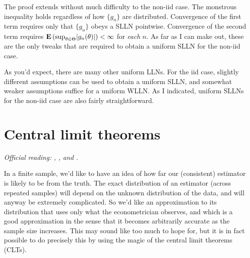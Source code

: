 \documentclass[11pt,letterpaper,reqno,oneside]{article}
\begin{document}
\begin{remark}
	\label{remark:non-iid_ULLNs}
	The proof extends without much difficulty to the non-iid case. The monstrous inequality holds regardless of how $\{ g_n \}$ are distributed. Convergence of the first term requires only that $\{ g_n \}$ obeys a SLLN pointwise. Convergence of the second term requires $\E\left( \sup_{\theta \in \Theta} \abs*{g_n(\theta)} \right) < \infty$ for \emph{each} $n$. As far as I can make out, these are the only tweaks that are required to obtain a uniform SLLN for the non-iid case.
\end{remark}

As you'd expect, there are many other uniform LLNs. For the iid case, slightly different assumptions can be used to obtain a uniform SLLN, and somewhat weaker assumptions suffice for a uniform WLLN. As I indicated, uniform SLLNs for the non-iid case are also fairly straightforward.



\pagebreak
\section{Central limit theorems}
\label{sec:CLTs}

\emph{%
Official reading: \textcite[][ch. 3]{Amemiya1985}, \textcite[][ch. 2]{Rao1973}, \textcite[][sec. 27]{Billingsley1995} and \textcite[][ch. 5]{White2001}.}

In a finite sample, we'd like to have an idea of how far our (consistent) estimator is likely to be from the truth. The exact distribution of an estimator (across repeated samples) will depend on the unknown distribution of the data, and will anyway be extremely complicated. So we'd like an approximation to its distribution that uses only what the econometrician observes, and which is a good approximation in the sense that it becomes arbitrarily accurate as the sample size increases. This may sound like too much to hope for, but it is in fact possible to do precisely this by using the magic of the central limit theorems (CLTs).
\end{document}
